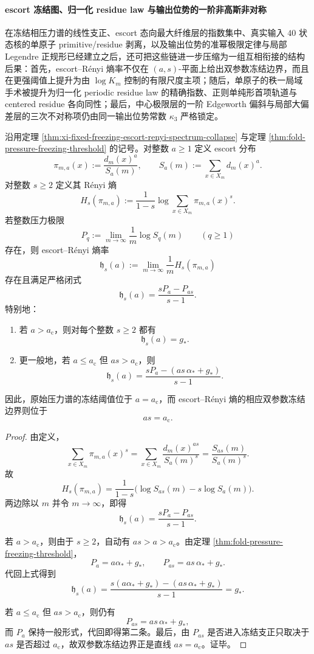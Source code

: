 \paragraph{escort 冻结图、归一化 residue law 与输出位势的一阶非高斯非对称}
在冻结相压力谱的线性支正、escort 态向最大纤维层的指数集中、真实输入 \(40\) 状态核的单原子 primitive/residue 剥离，以及输出位势的准幂极限定律与局部 Legendre 正规形已经建立之后，还可把这些链进一步压缩为一组互相衔接的结构后果：首先，escort--Rényi 熵率不仅在 \((a,s)\)-平面上给出双参数冻结边界，而且在更强阈值上提升为由 \(\log K_m\) 控制的有限尺度主项；随后，单原子的秩一局域手术被提升为归一化 periodic residue law 的精确指数、正则单纯形首项轨道与 centered residue 各向同性；最后，中心极限层的一阶 Edgeworth 偏斜与局部大偏差层的三次不对称项仍由同一输出位势常数 \(\kappa_3\) 严格锁定。

\begin{theorem}\label{thm:xi-time-part65c-escort-renyi-two-parameter-freezing-line}
沿用定理 \ref{thm:xi-fixed-freezing-escort-renyi-spectrum-collapse} 与定理 \ref{thm:fold-pressure-freezing-threshold} 的记号。对整数 \(a\ge 1\) 定义 escort 分布
\[
\pi_{m,a}(x):=\frac{d_m(x)^a}{S_a(m)},
\qquad
S_a(m):=\sum_{x\in X_m}d_m(x)^a.
\]
对整数 \(s\ge 2\) 定义其 Rényi 熵
\[
H_s(\pi_{m,a})
:=
\frac{1}{1-s}\log\sum_{x\in X_m}\pi_{m,a}(x)^s.
\]
若整数压力极限
\[
P_q:=\lim_{m\to\infty}\frac{1}{m}\log S_q(m)
\qquad(q\ge 1)
\]
存在，则 escort--Rényi 熵率
\[
\mathfrak h_s(a):=
\lim_{m\to\infty}\frac{1}{m}H_s(\pi_{m,a})
\]
存在且满足严格闭式
\[
\boxed{\;
\mathfrak h_s(a)=\frac{sP_a-P_{as}}{s-1}.\;}
\]
特别地：
\begin{enumerate}
  \item 若 \(a>a_{\mathrm c}\)，则对每个整数 \(s\ge 2\) 都有
  \[
  \boxed{\;\mathfrak h_s(a)=g_*.\;}
  \]
  \item 更一般地，若 \(a\le a_{\mathrm c}\) 但 \(as>a_{\mathrm c}\)，则
  \[
  \boxed{\;
  \mathfrak h_s(a)
  =
  \frac{sP_a-(as\,\alpha_*+g_*)}{s-1}.\;}
  \]
\end{enumerate}
因此，原始压力谱的冻结阈值位于 \(a=a_{\mathrm c}\)，而 escort--Rényi 熵的相应双参数冻结边界则位于
\[
\boxed{\;as=a_{\mathrm c}.\;}
\]
\end{theorem}
\begin{proof}
由定义，
\[
\sum_{x\in X_m}\pi_{m,a}(x)^s
=
\sum_{x\in X_m}\frac{d_m(x)^{as}}{S_a(m)^s}
=
\frac{S_{as}(m)}{S_a(m)^s}.
\]
故
\[
H_s(\pi_{m,a})
=
\frac{1}{1-s}\bigl(\log S_{as}(m)-s\log S_a(m)\bigr).
\]
两边除以 \(m\) 并令 \(m\to\infty\)，即得
\[
\mathfrak h_s(a)=\frac{sP_a-P_{as}}{s-1}.
\]

若 \(a>a_{\mathrm c}\)，则由于 \(s\ge 2\)，自动有 \(as>a>a_{\mathrm c}\)。由定理 \ref{thm:fold-pressure-freezing-threshold}，
\[
P_a=a\alpha_*+g_*,
\qquad
P_{as}=as\,\alpha_*+g_*.
\]
代回上式得到
\[
\mathfrak h_s(a)
=
\frac{s(a\alpha_*+g_*)-(as\,\alpha_*+g_*)}{s-1}
=
g_*.
\]

若 \(a\le a_{\mathrm c}\) 但 \(as>a_{\mathrm c}\)，则仍有
\[
P_{as}=as\,\alpha_*+g_*,
\]
而 \(P_a\) 保持一般形式，代回即得第二条。最后，由 \(P_{as}\) 是否进入冻结支正只取决于 \(as\) 是否超过 \(a_{\mathrm c}\)，故双参数冻结边界正是直线 \(as=a_{\mathrm c}\)。证毕。
\end{proof}


